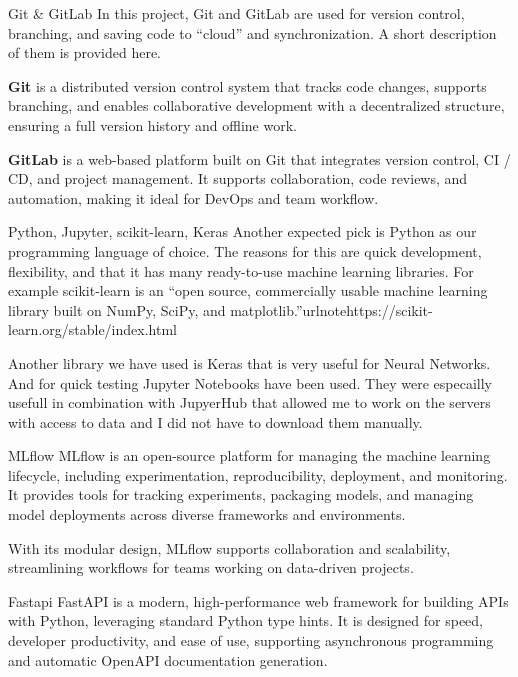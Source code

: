 \secc Git \& GitLab
In this project, Git and GitLab are used for version control, branching, and  saving code to ``cloud'' and synchronization. A short description of them is provided here. 

{\bf Git} is a distributed version control system that tracks code changes, supports branching, and enables collaborative development with a decentralized structure, ensuring a full version history and offline work.

{\bf GitLab} is a web-based platform built on Git that integrates version control, CI / CD, and project management. It supports collaboration, code reviews, and automation, making it ideal for DevOps and team workflow.

\secc Python, Jupyter, scikit-learn, Keras
Another expected pick is Python as our programming language of choice. The reasons for this are quick development, flexibility, and that it has many ready-to-use machine learning libraries. For example scikit-learn is an ``open source, commercially usable machine learning library built on NumPy, SciPy, and matplotlib.''urlnote{https://scikit-learn.org/stable/index.html}

Another library we have used is Keras that is very useful for Neural Networks. And for quick testing Jupyter Notebooks have been used. They were especailly usefull in combination with JupyerHub that allowed me to work on the servers with access to data and I did not have to download them manually. 

\secc MLflow
MLflow is an open-source platform for managing the machine learning lifecycle, including experimentation, reproducibility, deployment, and monitoring. It provides tools for tracking experiments, packaging models, and managing model deployments across diverse frameworks and environments.

With its modular design, MLflow supports collaboration and scalability, streamlining workflows for teams working on data-driven projects.

\secc Fastapi
FastAPI is a modern, high-performance web framework for building APIs with Python, leveraging standard Python type hints. It is designed for speed, developer productivity, and ease of use, supporting asynchronous programming and automatic OpenAPI documentation generation.

